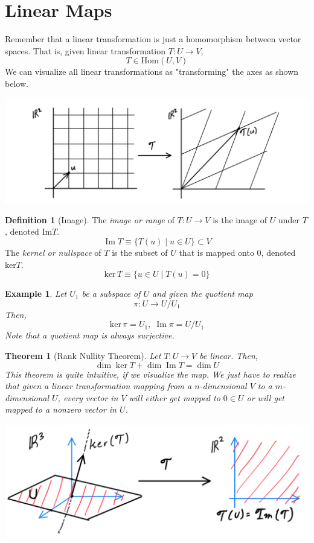 \documentclass{article}
\DeclareMathOperator{\im}{Im}
\newtheorem{theorem}{Theorem}[section]
\newtheorem{example}{Example}[section]
\theoremstyle{remark}
\theoremstyle{definition}
\newtheorem{definition}{Definition}[section]
\begin{document}
\section{Linear Maps}

  Remember that a linear transformation is just a homomorphism between vector spaces. That is, given linear transformation $T: U \longrightarrow V$, 
  \[T \in \text{Hom}(U,V)\]
  We can visualize all linear transformations as "transforming" the axes as shown below. 
  \begin{center}
    \includegraphics[scale=0.25]{img/Linear_Map.PNG}
  \end{center}

  \begin{definition}[Image]
  The \textit{image or range} of $T: U \longrightarrow V$ is the image of $U$ under $T$, denoted Im$T$. 
  \[\im{T} \equiv \{ T(u) \; | \; u \in U\} \subset V\]
  The \textit{kernel or nullspace} of $T$ is the subset of $U$ that is mapped onto $0$, denoted ker$T$. 
  \[\text{ker}\,T \equiv \{ u \in U \; | \; T(u) = 0\} \]
  \end{definition}

  \begin{example}
  Let $U_1$ be a subspace of $U$ and given the quotient map
  \[ \pi: U \longrightarrow U / U_1\]
  Then, 
  \[\text{ker}\,\pi = U_1, \; \im{\pi} = U / U_1\]
  Note that a quotient map is always surjective. 
  \end{example}

  \begin{theorem}[Rank Nullity Theorem]
  Let $T: U \longrightarrow V$ be linear. Then, 
  \[ \dim \ker T + \dim \im T = \dim U\]
  This theorem is quite intuitive, if we visualize the map. We just have to realize that given a linear transformation mapping from a $n$-dimensional $V$ to a $m$-dimensional $U$, every vector in $V$ will either get mapped to $0 \in U$ or will get mapped to a nonzero vector in $U$. 
  \begin{center}
      \includegraphics[scale=0.4]{img/Rank_Nullity.PNG}
  \end{center}
  \end{theorem}
\end{document}
